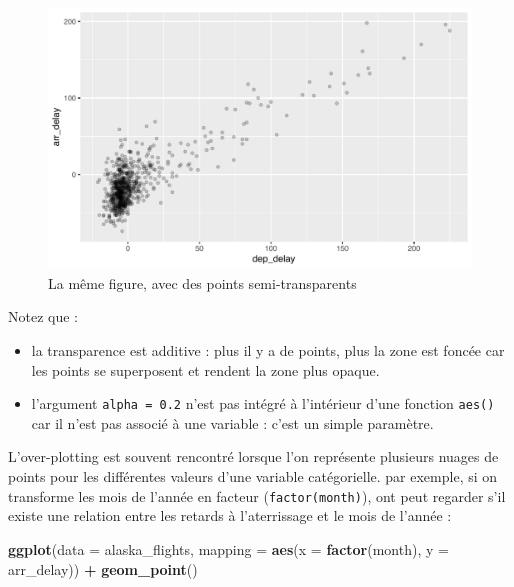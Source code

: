 \documentclass[a4paperpaper,]{article}
\newenvironment{Shaded}{\begin{snugshade}}{\end{snugshade}}
\newcommand{\KeywordTok}[1]{\textcolor[rgb]{0.13,0.29,0.53}{\textbf{#1}}}
\newcommand{\DataTypeTok}[1]{\textcolor[rgb]{0.13,0.29,0.53}{#1}}
\newcommand{\StringTok}[1]{\textcolor[rgb]{0.31,0.60,0.02}{#1}}
\newcommand{\OperatorTok}[1]{\textcolor[rgb]{0.81,0.36,0.00}{\textbf{#1}}}
\newcommand{\NormalTok}[1]{#1}
\providecommand{\tightlist}{%
  \setlength{\itemsep}{0pt}\setlength{\parskip}{0pt}}
\theoremstyle{definition}
\theoremstyle{definition}
\theoremstyle{definition}
\theoremstyle{remark}
\begin{document}
\begin{figure}[htpb]

{\centering \includegraphics[width=0.9\linewidth]{figure/unnamed-chunk-40-1} 

}

\caption{La même figure, avec des points semi-transparents}\label{fig:unnamed-chunk-40}
\end{figure}

Notez que :

\begin{itemize}
\tightlist
\item
  la transparence est additive : plus il y a de points, plus la zone est
  foncée car les points se superposent et rendent la zone plus opaque.
\item
  l'argument \texttt{alpha\ =\ 0.2} n'est pas intégré à l'intérieur
  d'une fonction \texttt{aes()} car il n'est pas associé à une variable
  : c'est un simple paramètre.
\end{itemize}

L'over-plotting est souvent rencontré lorsque l'on représente plusieurs
nuages de points pour les différentes valeurs d'une variable
catégorielle. par exemple, si on transforme les mois de l'année en
facteur (\texttt{factor(month)}), ont peut regarder s'il existe une
relation entre les retards à l'aterrissage et le mois de l'année :

\begin{Shaded}
\begin{Highlighting}[]
\KeywordTok{ggplot}\NormalTok{(}\DataTypeTok{data =}\NormalTok{ alaska_flights, }\DataTypeTok{mapping =} \KeywordTok{aes}\NormalTok{(}\DataTypeTok{x =} \KeywordTok{factor}\NormalTok{(month), }\DataTypeTok{y =}\NormalTok{ arr_delay)) }\OperatorTok{+}
\StringTok{  }\KeywordTok{geom_point}\NormalTok{()}
\end{Highlighting}
\end{Shaded}
\end{document}
